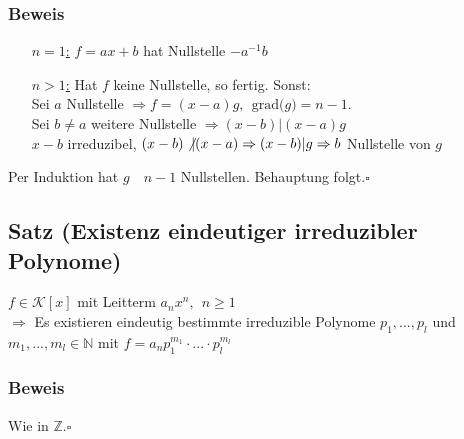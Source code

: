 \documentclass[a4paper, 12pt,titlepage, pdf, headsepline]{article}
\newcommand{\grad}[1]{\textrm{grad(}#1\textrm{)}}
\newcommand{\N}{\mathds{N}}
\newcommand{\K}{\mathcal{K}}
\newcommand{\uline}[1]{\underline{#1}}
\newcommand{\qed}{\hfill$\square$}
\renewcommand{\>}{\rightarrow}
\renewcommand{\*}{\cdot}
\begin{document}
		      	\subsubsection*{Beweis}
		      	\begin{itemize}
		      		\item[\uline{$n=1$:}] $f = ax +b$ hat Nullstelle $-a^{-1}b$
		      		\item[\uline{$n>1$:}] Hat $f$ keine Nullstelle, so fertig. Sonst: \\
		      		      Sei $a$ Nullstelle $\Rightarrow f = (x-a)g, ~~\grad{g} = n-1$. \\
		      		      Sei $b \neq a$ weitere Nullstelle $\Rightarrow (x-b) \vert (x-a)g$\\
		      		      $x -b$ irreduzibel, $(x-b) \not \vert (x-a) \Rightarrow (x-b) \vert g\\ \Rightarrow b$ Nullstelle von $g$ 
		      	\end{itemize}
		      	Per Induktion hat $g \quad n-1$ Nullstellen. Behauptung folgt.\qed
		      	\subsection{Satz (Existenz eindeutiger irreduzibler Polynome)}
		      	$f \in \K[x]$ mit Leitterm $a_nx^n, ~~n \geq 1$ \\
		      	$\Rightarrow$ Es existieren eindeutig bestimmte irreduzible Polynome $p_1,...,p_l$ und $m_1,...,m_l\in \N$ mit $f = a_n p_1^{m_1} \cdot ... \cdot p_l^{m_l}$ 
		      	\subsubsection*{Beweis} Wie in $\mathds{Z}$.\qed
\end{document}
